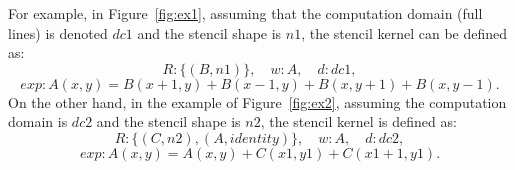 For example, in Figure~\ref{fig:ex1}, assuming that the computation domain (full lines) is denoted $dc1$ and the stencil shape is $n1$, the stencil kernel can be defined as:
\begin{equation*}
R: \{(B,n1)\}, \quad w: A, \quad d: dc1,
\end{equation*}
\begin{equation*}
exp: A(x,y)=B(x+1,y)+B(x-1,y)+B(x,y+1)+B(x,y-1).
\end{equation*}
On the other hand, in the example of Figure~\ref{fig:ex2}, assuming the computation domain is $dc2$ and the stencil shape is $n2$, the stencil kernel is defined as:
\begin{equation*}
R: \{(C,n2),(A,identity)\}, \quad w: A, \quad d: dc2,
\end{equation*}
\begin{equation*}
exp: A(x,y)=A(x,y)+C(x1,y1)+C(x1+1,y1).
\end{equation*}

